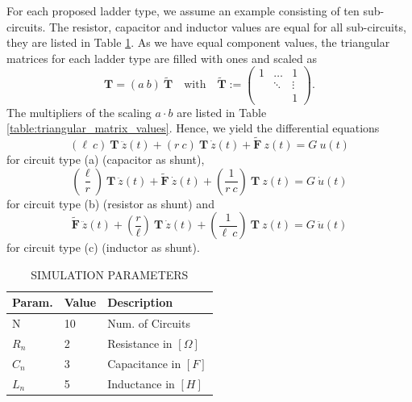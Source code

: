 \documentclass[a4paper, 10pt, twoside, twocolumn]{scrartcl}
\begin{document}
For each proposed ladder type, we assume an example consisting of ten sub-circuits. The resistor, capacitor and inductor values  are equal for all sub-circuits, they are listed in Table \ref{table:simulation_parameters}. As we have equal component values, the triangular matrices for each ladder type are filled with ones and scaled as
\begin{equation*}
	\mathbf{T} = \left(a~b\right) ~ \mathbf{\tilde{T}} \quad \text{with} \quad 
	\mathbf{\tilde{T}} :=
	\begin{pmatrix}
		1 & \ldots & 1 \\
		  & \ddots & \vdots \\
		 & & 1
	\end{pmatrix} 
	\textbf{.}
\end{equation*}
The multipliers of the scaling $a\cdot b$ are listed in Table \ref{table:triangular_matrix_values}. Hence, we yield the differential equations
\begin{equation}
	(\ell~c)~\mathbf{T} ~ \ddot{z}(t) + (r~c)~\mathbf{T}~ \dot{z}(t) + \mathbf{\tilde{F}}~ z(t) = G~u(t)
\end{equation}
for circuit type (a) (capacitor as shunt), 
\begin{equation}
	\left(\frac{\ell}{r}\right)~\mathbf{T}~ \ddot{z}(t) + \mathbf{\tilde{F}}~\dot{z}(t) + \left(\frac{1}{r~c}\right)~\mathbf{T}~ z(t) = G~\dot{u}(t)
\end{equation}
for circuit type (b) (resistor as shunt) and
\begin{equation}
	\mathbf{\tilde{F}}~ \ddot{z}(t) + \left(\frac{r}{\ell}\right) ~ \mathbf{T} ~ \dot{z}(t) + \left(\frac{1}{\ell~c}\right) ~ \mathbf{T} ~ z(t) = G~\ddot{u}(t)
\end{equation}
for circuit type (c) (inductor as shunt). 


\begin{table}[b]
	\renewcommand{\arraystretch}{1.3}
	\centering
	\caption{\MakeUppercase{Simulation Parameters}}
	\begin{tabular}{l l l}
		\toprule
		Param. & Value & Description \\
		\midrule
		N & 10 & Num. of Circuits\\
		$R_{n}$ & 2 & Resistance in $[\Omega]$ \\
		$C_{n}$ & 3 & Capacitance in $[F]$\\
		$L_{n}$ & 5 & Inductance in $[H]$\\
		\bottomrule
	\end{tabular}
	\label{table:simulation_parameters}
\end{table}
\end{document}
